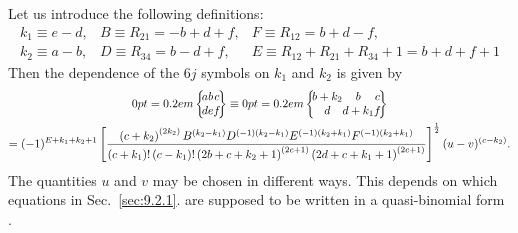 Let us introduce the following definitions:
\begin{equation}
\begin{array}{lll}
k_{1} \equiv e-d, & B \equiv R_{21}=-b+d+f, & F \equiv R_{12}=b+d-f, \\
k_{2} \equiv a-b, & D \equiv R_{34}=b-d+f, & E \equiv R_{12}+R_{21}+R_{34}+1=b+d+f+1 \label{eq:9:2:14}
\end{array}
\end{equation}
Then the dependence of the $6 j$ symbols on $k_{1}$ and $k_{2}$ is given by
\begin{gather}
\sixj{a}{b}{c}{d}{e}{f} \equiv\sixj{b+k_{2}}{b}{c}{d}{d+k_{1}}{f}  \notag\\
=(-1)^{E+k_{1}+k_{2}+1}\left[\frac{\left(c+k_{2}\right)^{\left(2 k_{2}\right)} B^{\left(k_{2}-k_{1}\right)} D^{(-1)\left(k_{2}-k_{1}\right)} E^{(-1)\left(k_{2}+k_{1}\right)} F^{(-1)\left(k_{2}+k_{1}\right)}}{\left(c+k_{1}\right)!\left(c-k_{1}\right)!\left(2 b+c+k_{2}+1\right)^{(2 c+1)}\left(2 d+c+k_{1}+1\right)^{(2 c+1)}}\right]^{\frac{1}{2}}(u-v)^{\left(c-k_{2}\right)} . \label{eq:9:2:15}
\end{gather}
The quantities $u$ and $v$ may be chosen in different ways. This depends on which equations in Sec.~\ref{sec:9.2.1}. are supposed to be written in a quasi-binomial form \cite{ref045}.

